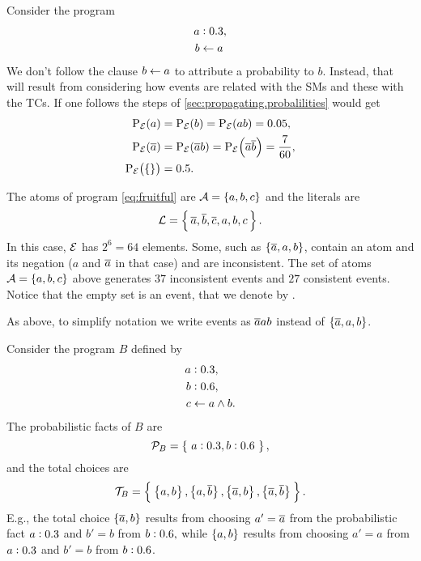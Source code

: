 \documentclass{article}
\begin{document}
Consider the program
\begin{equation*}
	\begin{split}
		a&:0.3, \\
		b & \leftarrow a
	\end{split}
\end{equation*}
We don't follow the clause \(b \leftarrow a\) to attribute a probability to \(b\). Instead, that will result from considering how events are related with the \aclp{SM} and these with the \aclp{TC}. If one follows the steps of \cref{sec:propagating.probalilities} would get
\begin{equation*}
	\begin{split}
		\prE\at{a} & = \prE\at{b} = \prE\at{ab} = 0.05,\\
		\prE\at{\co{a}} & = \prE\at{\co{a} b} = \prE\at{\co{a}\co{b}} = \frac{7}{60},\\
		\prE\at{\set{}} & = 0.5.\\
	\end{split}
\end{equation*}

The atoms of program \cref{eq:fruitful} are
\({\cal A} = \set{a, b, c}\) and the literals are
\begin{equation*}
	{\cal L} = \set{\, \ensuremath{\overline{a}}, \ensuremath{\overline{b}}, \ensuremath{\overline{c}}, a, b, c\, }.
\end{equation*}
In this case, \({\cal E}\) has \(2^6 = 64\) elements.  Some, such as
\(\set{\ensuremath{\overline{a}}, a, b}\), contain an atom and its negation (\(a\) and
\(\overline{a}\) in that case) and are inconsistent.  The set of atoms
\({\cal A} = \set{a, b, c}\) above generates \(37\) inconsistent
events and \(27\) consistent events.  Notice that the empty set is an
event, that we denote by \emptyevent.

As above, to simplify notation we write events as \(\overline{a}ab\) instead
of \(\set{\ensuremath{\overline{a}}, a, b}\).

Consider the program $B$ defined by
\begin{equation*}
	\begin{split}
		a&:0.3,\\
		b&:0.6,\\
		c & \leftarrow a \wedge b.
	\end{split}\label{eq:total.choices}
\end{equation*}
The probabilistic facts of \(B\) are
\[ {\cal P}_{B} = \set{~\ensuremath{a:0.3}, \ensuremath{b:0.6}~}, \]
and the total choices are
\[ {\cal T}_{B} = \set[2]{\:
		\set[1]{a, b},
		\set[1]{a, \ensuremath{\overline{b}}},
		\set[1]{\ensuremath{\overline{a}}, b},
		\set[1]{\ensuremath{\overline{a}}, \ensuremath{\overline{b}}}\: }. \]
E.g., the total choice \(\set{\ensuremath{\overline{a}}, b} \)
results from choosing \(a' = \overline{a}\) from the probabilistic fact
$a:0.3$ and $b' = b$ from \(b:0.6, \)
while \(\set{a, b} \) results from choosing \(a' = a\) from
\(a:0.3\) and \(b' = b\) from \(b:0.6\).
\end{document}
